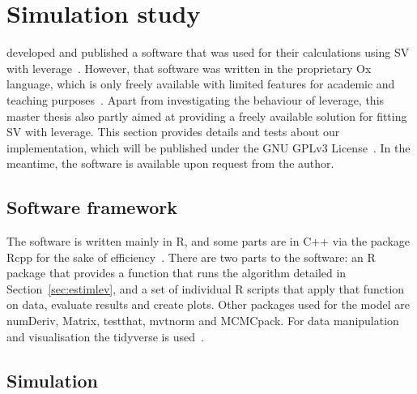 \section{Simulation study}

\citet{Nakajima2009} developed and published a software that was used for their calculations using SV with leverage~\citep{nakajima2009code}.
However, that software was written in the proprietary Ox language, which is only freely available with limited features for academic and teaching purposes~\citep{doornik2009object}.
Apart from investigating the behaviour of leverage, this master thesis also partly aimed at providing a freely available solution for fitting SV with leverage.
This section provides details and tests about our implementation, which will be published under the GNU GPLv3 License~\citep{gplv3}.
In the meantime, the software is available upon request from the author.

\subsection{Software framework}

The software is written mainly in R, and some parts are in C++ via the package Rcpp for the sake of efficiency~\citep{rlanguage,rcpp2011,iso2016iec}.
There are two parts to the software: an R package that provides a function that runs the algorithm detailed in Section~\ref{sec:estimlev}, and a set of individual R scripts that apply that function on data, evaluate results and create plots.
Other packages used for the model are numDeriv, Matrix, testthat, mvtnorm and MCMCpack.
For data manipulation and visualisation the tidyverse is used~\citep{rmcmcpack,rtestthat,rmatrix,rnumderiv,rmvtnorm,rtidyverse}.

\subsection{Simulation}\label{sec:simulation}

